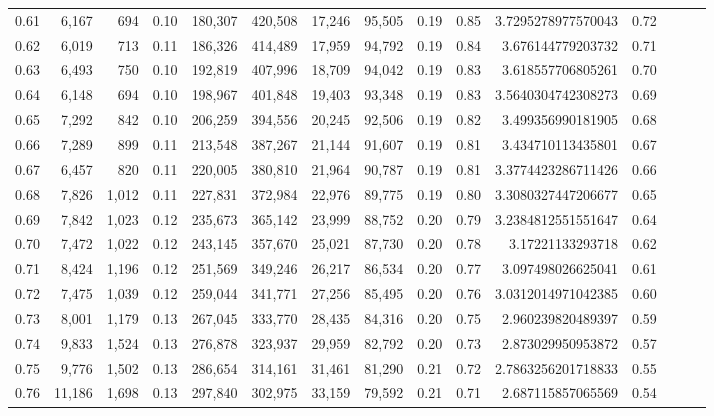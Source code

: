 \begin{tabular}{rrrrrrrrrrrrrrr}
0.61 &   6,167 &    694 &  0.10 &  180,307 &  420,508 &   17,246 &   95,505 &  0.19 &  0.85 &   3.7295278977570043 &      0.72 \\
0.62 &   6,019 &    713 &  0.11 &  186,326 &  414,489 &   17,959 &   94,792 &  0.19 &  0.84 &    3.676144779203732 &      0.71 \\
0.63 &   6,493 &    750 &  0.10 &  192,819 &  407,996 &   18,709 &   94,042 &  0.19 &  0.83 &    3.618557706805261 &      0.70 \\
0.64 &   6,148 &    694 &  0.10 &  198,967 &  401,848 &   19,403 &   93,348 &  0.19 &  0.83 &   3.5640304742308273 &      0.69 \\
0.65 &   7,292 &    842 &  0.10 &  206,259 &  394,556 &   20,245 &   92,506 &  0.19 &  0.82 &    3.499356990181905 &      0.68 \\
0.66 &   7,289 &    899 &  0.11 &  213,548 &  387,267 &   21,144 &   91,607 &  0.19 &  0.81 &    3.434710113435801 &      0.67 \\
0.67 &   6,457 &    820 &  0.11 &  220,005 &  380,810 &   21,964 &   90,787 &  0.19 &  0.81 &   3.3774423286711426 &      0.66 \\
0.68 &   7,826 &  1,012 &  0.11 &  227,831 &  372,984 &   22,976 &   89,775 &  0.19 &  0.80 &   3.3080327447206677 &      0.65 \\
0.69 &   7,842 &  1,023 &  0.12 &  235,673 &  365,142 &   23,999 &   88,752 &  0.20 &  0.79 &   3.2384812551551647 &      0.64 \\
0.70 &   7,472 &  1,022 &  0.12 &  243,145 &  357,670 &   25,021 &   87,730 &  0.20 &  0.78 &     3.17221133293718 &      0.62 \\
0.71 &   8,424 &  1,196 &  0.12 &  251,569 &  349,246 &   26,217 &   86,534 &  0.20 &  0.77 &    3.097498026625041 &      0.61 \\
0.72 &   7,475 &  1,039 &  0.12 &  259,044 &  341,771 &   27,256 &   85,495 &  0.20 &  0.76 &   3.0312014971042385 &      0.60 \\
0.73 &   8,001 &  1,179 &  0.13 &  267,045 &  333,770 &   28,435 &   84,316 &  0.20 &  0.75 &    2.960239820489397 &      0.59 \\
0.74 &   9,833 &  1,524 &  0.13 &  276,878 &  323,937 &   29,959 &   82,792 &  0.20 &  0.73 &    2.873029950953872 &      0.57 \\
0.75 &   9,776 &  1,502 &  0.13 &  286,654 &  314,161 &   31,461 &   81,290 &  0.21 &  0.72 &   2.7863256201718833 &      0.55 \\
0.76 &  11,186 &  1,698 &  0.13 &  297,840 &  302,975 &   33,159 &   79,592 &  0.21 &  0.71 &    2.687115857065569 &      0.54 \\

\end{tabular}
